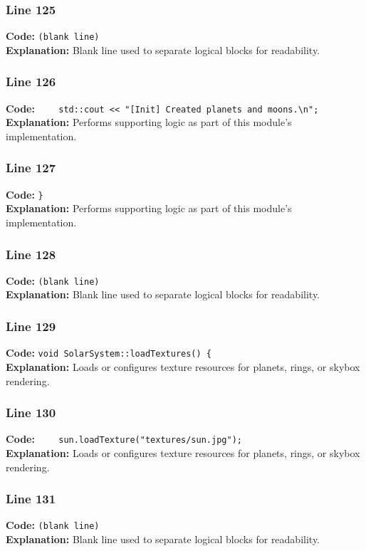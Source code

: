 \documentclass[11pt,a4paper]{article}
\begin{document}
\subsubsection*{Line 125}
\textbf{Code:} \texttt{(blank line)}\\
\textbf{Explanation:} Blank line used to separate logical blocks for readability.

\subsubsection*{Line 126}
\textbf{Code:} \verb|    std::cout << "[Init] Created planets and moons.\n";|\\
\textbf{Explanation:} Performs supporting logic as part of this module's implementation.

\subsubsection*{Line 127}
\textbf{Code:} \verb|}|\\
\textbf{Explanation:} Performs supporting logic as part of this module's implementation.

\subsubsection*{Line 128}
\textbf{Code:} \texttt{(blank line)}\\
\textbf{Explanation:} Blank line used to separate logical blocks for readability.

\subsubsection*{Line 129}
\textbf{Code:} \verb|void SolarSystem::loadTextures() {|\\
\textbf{Explanation:} Loads or configures texture resources for planets, rings, or skybox rendering.

\subsubsection*{Line 130}
\textbf{Code:} \verb|    sun.loadTexture("textures/sun.jpg");|\\
\textbf{Explanation:} Loads or configures texture resources for planets, rings, or skybox rendering.

\subsubsection*{Line 131}
\textbf{Code:} \texttt{(blank line)}\\
\textbf{Explanation:} Blank line used to separate logical blocks for readability.
\end{document}
